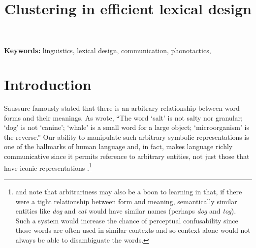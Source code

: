 \documentclass{article}
\title{Clustering in efficient lexical
design}
\begin{document}
\maketitle



\textbf{Keywords:} linguistics, lexical design, communication, phonotactics,

\begin{abstract}
\end{abstract}


\section{Introduction} Saussure famously stated that there is an arbitrary relationship between word forms and
their meanings. As \cite{hockett1960origin} wrote, ``The word `salt' is not salty nor granular; `dog' is not
`canine'; `whale' is a small word for a large object; `microorganism' is the reverse.'' Our ability to
manipulate such arbitrary symbolic representations is one of the hallmarks of human language and, in fact,
makes language richly communicative since it permits reference to arbitrary entities, not just those that have
iconic representations \citep{hockett1960origin}.\footnote{\cite{monaghan_arbitrariness_2011} and
\cite{Gasser2004origins} note that arbitrariness may also be a boon to learning in that, if there were a tight
relationship between form and meaning, semantically similar entities like \textit{dog} and \textit{cat} would
have similar names (perhaps \textit{dog} and \textit{tog}). Such a system would increase the chance of
perceptual confusability since those words are often used in similar contexts and so context alone would not
always be able to disambiguate the words.}
\end{document}
